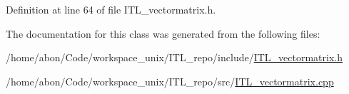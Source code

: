 Definition at line 64 of file ITL\_\-vectormatrix.h.



The documentation for this class was generated from the following files:\begin{DoxyCompactItemize}
\item 
/home/abon/Code/workspace\_\-unix/ITL\_\-repo/include/\hyperlink{ITL__vectormatrix_8h}{ITL\_\-vectormatrix.h}\item 
/home/abon/Code/workspace\_\-unix/ITL\_\-repo/src/\hyperlink{ITL__vectormatrix_8cpp}{ITL\_\-vectormatrix.cpp}\end{DoxyCompactItemize}
